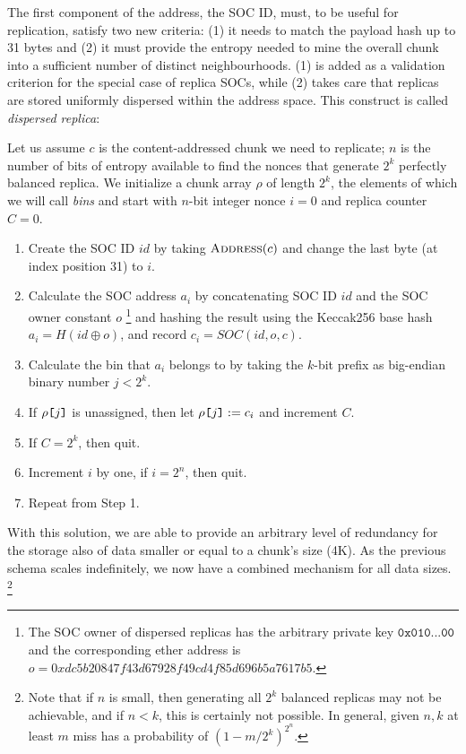\documentclass[manuscript,screen,review]{acmart}
\newcommand{\idx}[1]{\texttt{[}\/#1\/\texttt{]}}
\DeclareMathOperator{\concat}{\operatorname{\oplus}}
\begin{document}
The first component of the address, the SOC ID, must, to be useful for replication, satisfy two new criteria: (1) it needs to match the payload hash up to 31 bytes and (2) it must provide the entropy needed to mine the overall chunk into a sufficient number of distinct neighbourhoods. (1) is added as a validation criterion for the special case of replica SOCs, while (2) takes care that replicas are stored uniformly dispersed within the address space.
This construct is called \emph{dispersed replica}:

Let us assume $c$ is the content-addressed chunk we need to replicate; $n$ is the number of bits of entropy available to find the nonces that generate  $2^k$  perfectly balanced replica. We initialize a chunk array $\rho$ of length $2^k$, the elements of which we will call \emph{bins} and start with $n$-bit integer nonce $i=0$ and replica counter $C=0$.

\begin{enumerate}[noitemsep]
  \item Create the SOC ID $id$ by taking $\textsc{Address}(c)$ and change the last byte (at index position 31) to  $i$.
  \item Calculate the SOC address $a_i$ by concatenating SOC ID $id$ and the SOC owner constant $o$%
%
\footnote{The SOC owner of dispersed replicas has the arbitrary private key $\texttt{0x010...00}$
and the corresponding ether address is
$o = 0xdc5b20847f43d67928f49cd4f85d696b5a7617b5$.}
%
and hashing the result using the Keccak256 base hash $a_i=H(id\concat o)$, and record $c_i=\mathit{SOC}(id,o,c)$.
  \item Calculate the bin that $a_i$ belongs to by taking the $k$-bit prefix as big-endian binary number $j<2^k$.
  \item If $\rho\idx{j}$ is unassigned, then let $\rho\idx{j}:=c_i$ and increment $C$.
  \item If $C=2^k$, then quit.
  \item Increment $i$ by one, if $i=2^n$, then quit.
  \item Repeat from Step 1.
\end{enumerate}

With this solution, we are able to provide an arbitrary level of redundancy for the storage also of data smaller or equal to a chunk's size (4K). As the previous schema scales indefinitely, we now have a combined mechanism for all data sizes.
%
%
\footnote{Note that if $n$ is small, then generating all $2^k$ balanced replicas may not be achievable, and if $n<k$, this is certainly not possible.
In general, given $n, k$ at least $m$ miss has a probability of $(1 - m/2^k)^{2^n}$.}
\end{document}
